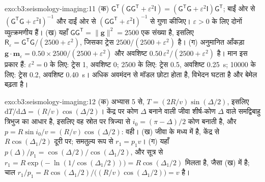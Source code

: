 \begin{solution}{exo:b3:seismology-imaging:11}
(क) $\mathsf G^{\mathsf T}(\mathsf G\mathsf G^{\mathsf T} + \varepsilon^2\mathsf I)
= (\mathsf G^{\mathsf T}\mathsf G + \varepsilon^2\mathsf I)\mathsf G^{\mathsf T}$;
बाईं ओर से $(\mathsf G^{\mathsf T}\mathsf G + \varepsilon^2
\mathsf I)^{-1}$ और दाईं ओर से $(\mathsf G\mathsf G^{\mathsf T} +
\varepsilon^2\mathsf I)^{-1}$ से गुणा कीजिए। $\varepsilon > 0$ के लिए दोनों व्युत्क्रमणीय हैं।
(ख) यहाँ $\mathsf G\mathsf G^{\mathsf T} = \|\mathbf g\|^2 = 2500$ एक संख्या है,
इसलिए $\mathsf R_\varepsilon = \mathsf G^{\mathsf T}\mathsf G/(2500 + \varepsilon^2)$,
जिसका ट्रेस $2500/(2500 + \varepsilon^2)$ है। (ग) अनुमानित आँकड़ा
$\mathbf g\cdot\mathbf m_\varepsilon = 0.50\times2500/(2500 + \varepsilon^2)$
और अवशिष्ट $0.50\,\varepsilon^2/(2500 + \varepsilon^2)$ है। मान इस प्रकार हैं:
$\varepsilon^2 = 0$ के लिए: ट्रेस 1, अवशिष्ट 0; 2500 के लिए: ट्रेस 0.5, अवशिष्ट
\qty{0.25}{s}; \num{10000} के लिए: ट्रेस 0.2, अवशिष्ट \qty{0.40}{s}।
अधिक अवमंदन से मॉडल छोटा होता है, विभेदन घटता है और बेमेल बढ़ता है।
\end{solution}

\begin{solution}{exo:b3:seismology-imaging:12}
(क) अभ्यास 5 से, $T = (2R/v)\sin(\Delta/2)$, इसलिए $\mathrm dT/\mathrm d\Delta
= (R/v)\cos(\Delta/2)$। केंद्र पर कोण $\Delta$ बनाने वाली जीवा
शीर्ष-कोण $\Delta$ वाले समद्विबाहु त्रिभुज का आधार है, इसलिए वह स्रोत पर त्रिज्या से
$i_0 = (\pi - \Delta)/2$ कोण बनाती है, और $p = R\sin i_0/v =
(R/v)\cos(\Delta/2)$: वही। (ख)  जीवा के मध्य में है,
केंद्र से $R\cos(\Delta_1/2)$ दूरी पर; समतुल्य रूप से
$r_1 = p_1v$। (ग) यहाँ $p(\Delta)/p_1 = \cos(\Delta/2)/\cos(\Delta_1/2)$, और
सूत्र से $r_1 = R\exp\bigl(-\ln(1/\cos(\Delta_1/2))\bigr) =
R\cos(\Delta_1/2)$ मिलता है, जैसा (ख) में है; चाल $r_1/p_1 = R\cos(\Delta_1/2)\big/
\bigl((R/v)\cos(\Delta_1/2)\bigr) = v$ है।
\end{solution}

